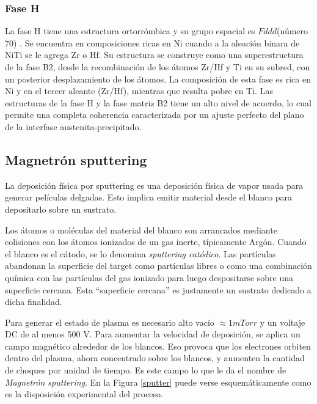 \documentclass[12pt]{article}
\theoremstyle{definition}
\theoremstyle{remark}
\begin{document}
\subsubsection{Fase H}
La fase H tiene una estructura ortorrómbica y su grupo espacial es $Fddd$(número 70) \cite{Yang2013} \cite{Santamarta2013}. Se encuentra en composiciones ricas en Ni cuando a la aleación binara de NiTi se le agrega Zr o Hf. Su estructura se construye como una superestructura de la fase B2, desde la recombinación de los átomos Zr/Hf y Ti en su subred, con un posterior desplazamiento de los átomos\cite{Evirgen2018}. La composición de esta fase es rica en Ni y en el tercer aleante (Zr/Hf), mientras que resulta pobre en Ti. Las estructuras de la fase H y la fase matriz B2 tiene un alto nivel de acuerdo, lo cual permite una completa coherencia caracterizada por un ajuste perfecto del plano de la interfase austenita-precipitado\cite{Evirgen2018}.




\subsection{Magnetrón sputtering}
La deposición física por sputtering es una deposición física de vapor usada para generar películas delgadas. Esto implica emitir material desde el blanco para depositarlo sobre un sustrato. 

 Los átomos o moléculas del material del blanco son arrancados mediante colisiones con los átomos ionizados de un gas inerte, típicamente Argón. Cuando el blanco es el cátodo, se lo denomina \textit{sputtering catódico}. Las partículas abandonan la superficie del target como partículas libres o como una combinación química con las partículas del gas ionizado para luego despositarse sobre una superficie cercana.  Esta ``superficie cercana'' es justamente un sustrato dedicado a dicha finalidad.
 
Para generar el estado de plasma es necesario alto vacío $\approx 1 mTorr$ y un voltaje DC de al menos 500 V. Para aumentar la velocidad de deposición, se aplica un campo magnético alrededor de los blancos. Eso provoca que los electrones orbiten dentro del plasma, ahora concentrado sobre los blancos, y aumenten la cantidad de choques por unidad de tiempo. Es este campo lo que le da el nombre de \textit{Magnetrón sputtering}\cite{Malvasio}\cite{ThinFilm}. En la Figura \ref{sputter} puede verse esquemáticamente como es la disposición experimental del proceso.
\end{document}
